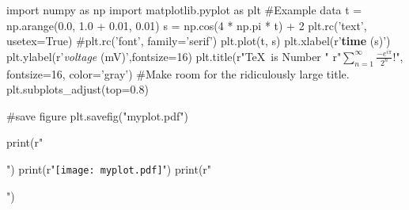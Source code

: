 \documentclass[11pt]{article}
\begin{document}
\begin{pycode}[pycode]

import numpy as np
import matplotlib.pyplot as plt
#Example data
t = np.arange(0.0, 1.0 + 0.01, 0.01)
s = np.cos(4 * np.pi * t) + 2
plt.rc('text', usetex=True)
#plt.rc('font', family='serif')
plt.plot(t, s)
plt.xlabel(r'\textbf{time} (s)')
plt.ylabel(r'\textit{voltage} (mV)',fontsize=16)
plt.title(r"\TeX\ is Number "
          r"$\displaystyle\sum_{n=1}^\infty\frac{-e^{i\pi}}{2^n}$!",
          fontsize=16, color='gray')
#Make room for the ridiculously large title.
plt.subplots_adjust(top=0.8)

#save figure
plt.savefig("myplot.pdf")

print(r"\begin{center}")
print(r"\texttt{[image: myplot.pdf]}")
print(r"\end{center}")



\end{pycode}
\end{document}
